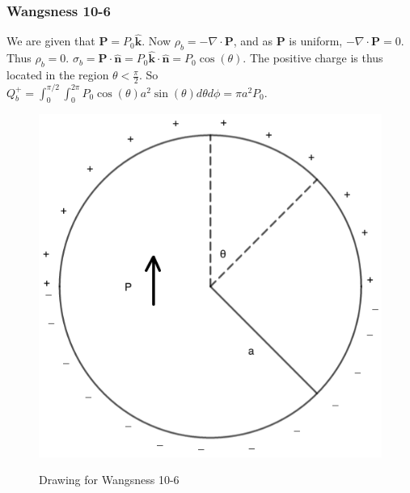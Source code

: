 \documentclass{article}
\theoremstyle{mystyle}
\begin{document}
\subsubsection{Wangsness 10-6}
We are given that $\mathbf{P} = P_0 \hat{\mathbf{k}}$. Now $\rho_{b} = -\nabla \cdot \mathbf{P}$, and as $\mathbf{P}$ is uniform, $-\nabla \cdot \mathbf{P} = 0$. Thus $\rho_b = 0$. $\sigma_b = \mathbf{P}\cdot \hat{\mathbf{n}} = P_0 \hat{\mathbf{k}} \cdot \hat{\mathbf{n}} = P_0 \cos(\theta)$. The positive charge is thus located in the region $\theta < \frac{\pi}{2}$. So $Q_b^+ = \int_{0}^{\pi/2}\int_{0}^{2\pi} P_0 \cos(\theta) a^2 \sin(\theta) d\theta d\phi = \pi a^2 P_0$.
\begin{figure}[htbp]
    \centering
    {\includegraphics[scale=0.3]{10-6.png}}
    \caption{Drawing for Wangsness 10-6}
\end{figure}
\end{document}
